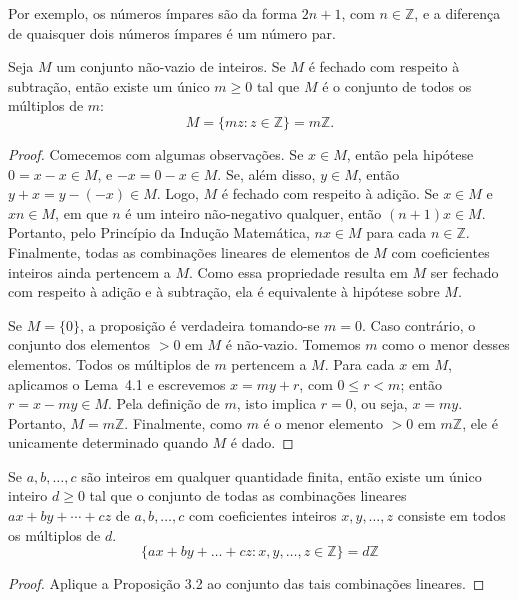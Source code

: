 Por exemplo, os números ímpares são da forma $2n + 1$, com $n \in \mathbb{Z}$, 
e a diferença de quaisquer dois números ímpares é um número par.

\begin{proposicao}
Seja $M$ um conjunto não-vazio de inteiros. 
Se $M$ é fechado com respeito à subtração, então existe um único $m \geq 0$ 
tal que $M$ é o conjunto de todos os múltiplos de $m$:
\[
M = \{ mz : z \in \mathbb{Z} \} = m\mathbb{Z}.
\]
\end{proposicao}

\begin{proof}
Comecemos com algumas observações. 
Se $x \in M$, então pela hipótese $0 = x - x \in M$, e $-x = 0 - x \in M$. 
Se, além disso, $y \in M$, então $y + x = y - (-x) \in M$. 
Logo, $M$ é fechado com respeito à adição. 
Se $x \in M$ e $xn \in M$, em que $n$ é um inteiro não-negativo qualquer, 
então $(n+1)x \in M$. 
Portanto, pelo Princípio da Indução Matemática, $nx \in M$ para cada $n \in \mathbb{Z}$. 
Finalmente, todas as combinações lineares de elementos de $M$ com coeficientes inteiros 
ainda pertencem a $M$. Como essa propriedade resulta em $M$ ser fechado com respeito 
à adição e à subtração, ela é equivalente à hipótese sobre $M$.

Se $M = \{0\}$, a proposição é verdadeira tomando-se $m = 0$. 
Caso contrário, o conjunto dos elementos $> 0$ em $M$ é não-vazio. 
Tomemos $m$ como o menor desses elementos. 
Todos os múltiplos de $m$ pertencem a $M$. 
Para cada $x$ em $M$, aplicamos o Lema~4.1 e escrevemos
$x = my + r$, com $0 \leq r < m$; então $r = x - my \in M$. 
Pela definição de $m$, isto implica $r = 0$, ou seja, $x = my$. 
Portanto, $M = m\mathbb{Z}$. 
Finalmente, como $m$ é o menor elemento $> 0$ em $m\mathbb{Z}$, 
ele é unicamente determinado quando $M$ é dado.
\end{proof}

\begin{corolario}
Se $a, b, \ldots, c$ são inteiros em qualquer quantidade finita, 
então existe um único inteiro $d \ge 0$ tal que o conjunto de todas as combinações lineares $ax + by + \cdots + cz$ de 
$a, b, \ldots, c$ com coeficientes inteiros $x, y, \ldots, z$ consiste em todos os múltiplos de $d$.
\[
\{ax + by + \ldots + cz : x,y,\ldots,z \in \mathbb{Z} \} = d\mathbb{Z}
\]
\end{corolario}

\begin{proof}
Aplique a Proposição 3.2 ao conjunto das tais combinações lineares.
\end{proof}

